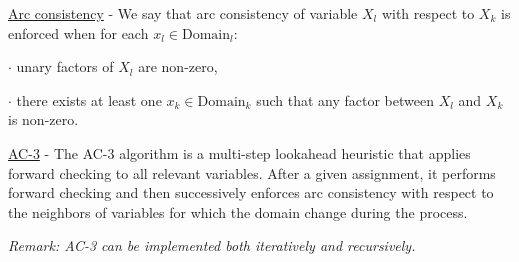 \documentclass[4pt,landscape]{article}
\begin{document}
\begin{multicols*}{4}
 {\tiny \underline{Arc consistency} - We say that arc consistency of variable $X_l$ with respect to $X_k$ is enforced when for each $x_l \in \textrm{Domain}_l$:}\par
 {$\cdot$ unary factors of $X_l$ are non-zero,}\par
 {$\cdot$ there exists at least one $x_k \in \textrm{Domain}_k$ such that any factor between $X_l$ and $X_k$ is non-zero.}\par
 {\tiny \underline{AC-3} - The AC-3 algorithm is a multi-step lookahead heuristic that applies forward checking to all relevant variables. After a given assignment, it performs forward checking and then successively enforces arc consistency with respect to the neighbors of variables for which the domain change during the process.}\par
 {\tiny \textit{Remark: AC-3 can be implemented both iteratively and recursively.}}\par
 

\end{multicols*}
\end{document}
